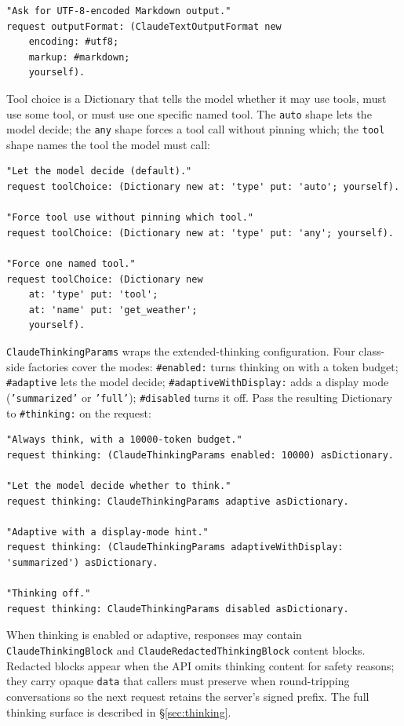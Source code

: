 \documentclass[a4paper,10pt,fleqn]{article}
\newcommand{\cls}[1]{\texttt{#1}}
\newcommand{\sel}[1]{\texttt{\##1}}
\begin{document}
\begin{lstlisting}[language={}]
"Ask for UTF-8-encoded Markdown output."
request outputFormat: (ClaudeTextOutputFormat new
    encoding: #utf8;
    markup: #markdown;
    yourself).
\end{lstlisting}

Tool choice is a Dictionary that tells the model whether it may
use tools, must use some tool, or must use one specific named
tool.  The \texttt{auto} shape lets the model decide; the
\texttt{any} shape forces a tool call without pinning which; the
\texttt{tool} shape names the tool the model must call:

\begin{lstlisting}[language={}]
"Let the model decide (default)."
request toolChoice: (Dictionary new at: 'type' put: 'auto'; yourself).

"Force tool use without pinning which tool."
request toolChoice: (Dictionary new at: 'type' put: 'any'; yourself).

"Force one named tool."
request toolChoice: (Dictionary new
    at: 'type' put: 'tool';
    at: 'name' put: 'get_weather';
    yourself).
\end{lstlisting}

\cls{ClaudeThinkingParams} wraps the extended-thinking
configuration.  Four class-side factories cover the modes:
\sel{enabled:} turns thinking on with a token budget;
\sel{adaptive} lets the model decide; \sel{adaptiveWithDisplay:}
adds a display mode (\texttt{'summarized'} or \texttt{'full'});
\sel{disabled} turns it off.  Pass the resulting Dictionary to
\sel{thinking:} on the request:

\begin{lstlisting}[language={}]
"Always think, with a 10000-token budget."
request thinking: (ClaudeThinkingParams enabled: 10000) asDictionary.

"Let the model decide whether to think."
request thinking: ClaudeThinkingParams adaptive asDictionary.

"Adaptive with a display-mode hint."
request thinking: (ClaudeThinkingParams adaptiveWithDisplay: 'summarized') asDictionary.

"Thinking off."
request thinking: ClaudeThinkingParams disabled asDictionary.
\end{lstlisting}

\begin{sloppypar}
When thinking is enabled or adaptive, responses may contain
\cls{ClaudeThinkingBlock} and \cls{ClaudeRedactedThinkingBlock}
content blocks.  Redacted blocks appear when the API omits
thinking content for safety reasons; they carry opaque
\texttt{data} that callers must preserve when round-tripping
conversations so the next request retains the server's signed
prefix.  The full thinking surface is described in
\S\ref{sec:thinking}.
\end{sloppypar}
\end{document}
